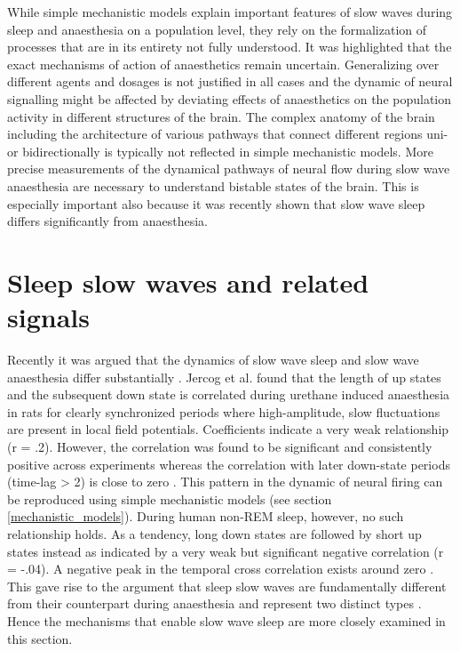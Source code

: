 While simple mechanistic models explain important features of slow waves during sleep and anaesthesia on a population level, they rely on the formalization of processes that are in its entirety not fully understood. It was highlighted that the exact mechanisms of action of anaesthetics remain uncertain. Generalizing over different agents and dosages is not justified in all cases and the dynamic of neural signalling might be affected by deviating effects of anaesthetics on the population activity in different structures of the brain. The complex anatomy of the brain including the architecture of various pathways that connect different regions uni- or bidirectionally is typically not reflected in simple mechanistic models. More precise measurements of the dynamical pathways of neural flow during slow wave anaesthesia are necessary to understand bistable states of the brain. This is especially important also because it was recently shown that slow wave sleep differs significantly from anaesthesia.
\section{Sleep slow waves and related signals}
\label{slow_waves_anaesthesia_sleep}
Recently it was argued that the dynamics of slow wave sleep and slow wave anaesthesia differ substantially \parencite{nghiem2018two}. Jercog et al. \parencite*{jercog2017up} found that the length of up states and the subsequent down state is correlated during urethane induced anaesthesia in rats for clearly synchronized periods where high-amplitude, slow fluctuations are present in local field potentials. Coefficients indicate a very weak relationship (r = .2). However, the correlation was found to be significant and consistently positive across experiments whereas the correlation with later down-state periods (time-lag > 2) is close to zero \parencite{jercog2017up}. This pattern in the dynamic of neural firing can be reproduced using simple mechanistic models (see section \ref{mechanistic_models}). During human non-REM sleep, however, no such relationship holds. As a tendency, long down states are followed by short up states instead as indicated by a very weak but significant negative correlation (r = -.04). A negative peak in the temporal cross correlation exists around zero \parencite{nghiem2018two}. This gave rise to the argument that sleep slow waves are fundamentally different from their counterpart during anaesthesia and represent two distinct types \parencite{nghiem2018two}. Hence the mechanisms that enable slow wave sleep are more closely examined in this section. \\
